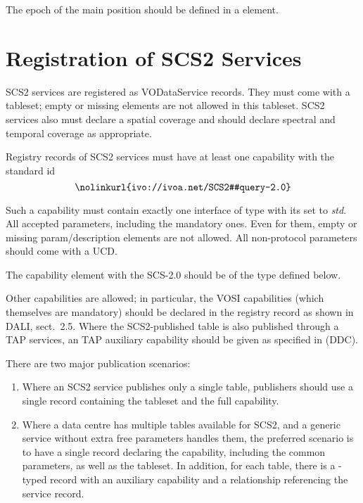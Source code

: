 \documentclass[11pt,a4paper]{ivoa}
\begin{document}
The epoch of the main position should be defined in a  element.


\section{Registration of SCS2 Services}

SCS2 services are registered as VODataService
\citep{2021ivoa.spec.1102D}  records.  They must come
with a tableset; empty or missing  elements are
not allowed in this tableset.  SCS2 services also must declare a spatial
coverage and should declare spectral and temporal coverage as
appropriate.

Registry records of SCS2 services must have at least one capability with
the standard id
$$
\hbox{\nolinkurl{ivo://ivoa.net/SCS2#query-2.0}}
$$

Such a capability must contain exactly one interface of type
 with its  set to \emph{std}.  All
accepted parameters, including the mandatory ones.  Even for them, empty
or missing param/description elements are not allowed.  All non-protocol
parameters should come with a UCD.

The capability element with the SCS-2.0  should be of
the type  defined below.

Other capabilities are allowed; in particular, the VOSI capabilities
(which themselves are mandatory) should be declared in the registry
record as shown in DALI, sect.~2.5.  Where the SCS2-published table is
also published through a TAP services, an TAP auxiliary capability
should be given as specified in \citet{2019ivoa.spec.0520D} (DDC).

There are two major publication scenarios:

\begin{enumerate}
\item Where an SCS2 service publishes only a single table, publishers
should use a single  record containing the
tableset and the full capability.

\item Where a data centre has multiple tables available for SCS2, and a
generic service without extra free parameters handles them, the
preferred scenario is to have a single  record
declaring the capability, including the common parameters, as well as
the tableset.  In addition, for each table, there is a
-typed record with an auxiliary capability and
a relationship referencing the service record.

\end{enumerate}
\end{document}
